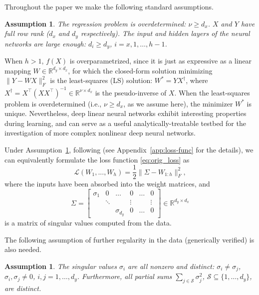 \documentclass{article}
\newtheorem{assumption}[proposition]{Assumption}
\newcommand{\1}{\mathds{1}}
\newcommand{\beq}{\begin{equation}}
\newcommand{\eeq}{\end{equation}}
\begin{document}
Throughout the paper we make the following standard assumptions.
\begin{assumption}
\label{ass:size}
The regression problem is overdetermined: $ \nu \geq d_x $. $ X $ and $ Y$ have full row rank ($ d_x$ and $ d_y$ respectively). The input and hidden layers of the neural networks are large enough: $ d_i \geq d_y $, $i =x, 1, \ldots, h-1 $.
\end{assumption}
When $ h>1 $, $ f(X)$ is overparametrized, since it is just as expressive as a linear mapping $W\in\mathbb{R}^{d_y\times d_x}$, for which the closed-form solution minimizing $\lVert Y-WX\rVert_F^2$ is the least-squares (LS) solution: $W^\ast=YX^{\dagger}$, where $X^{\dagger}=X^\top(XX^\top)^{-1}\in\mathbb{R}^{\nu\times d_x}$ is the pseudo-inverse of $X$. When the least-squares problem is overdetermined (i.e., $ \nu \geq d_x $, as we assume here), the minimizer $W^\ast$ is unique. Nevertheless, deep linear neural networks exhibit interesting properties during learning, and can serve as a useful analytically-treatable testbed for the investigation of more complex nonlinear deep neural networks.

Under Assumption~\ref{ass:size}, following \cite{chitour2018geometric} (see Appendix~\ref{app:loss-func} for the details), we can equivalently formulate the loss function \eqref{eq:orig_loss} as
\begin{equation}\label{eq:loss}
    \mathcal{L}(W_1,...,W_h) = \frac{1}{2} \lVert \Sigma-W_{1:h}\rVert_F^2,
\end{equation}
where the inputs have been absorbed into the weight matrices, and 
\beq\label{eq:Sigma-diag}
\Sigma=\begin{bmatrix} 
\sigma_1 & 0 & \ldots & 0 & \ldots & 0 \\
 &  \ddots &  & \vdots  & & \vdots \\
 & &  \sigma_{d_y} & 0 & \ldots & 0
 \end{bmatrix}\in\mathbb{R}^{d_y\times d_x}
 \eeq
is a matrix of singular values computed from the data. 

The following assumption of further regularity in the data (generically verified) is also needed.
\begin{assumption}
\label{ass:distinct-sums}
The singular values $ \sigma_i $ are all nonzero and distinct: $ \sigma_i \neq \sigma_j$, $ \sigma_i, \sigma_j \neq 0$, $ i,j=1, \ldots, d_y $. 
Furthermore, all partial sums $ \sum_{j\in \mathcal{S}} \sigma_j^2 $, $ \mathcal{S} \subseteq \{ 1, \ldots, d_y \}$, are distinct. 
\end{assumption}
\end{document}
